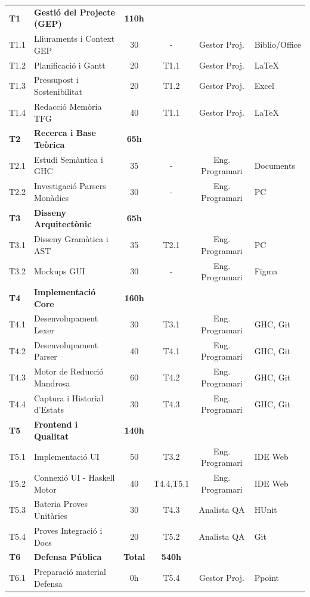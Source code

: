 \begin{longtable}{@{}lp{5cm}cccp{3cm}@{}}
\textbf{T1} & \textbf{Gestió del Projecte (GEP)} & \textbf{110h} & & & \\
T1.1 & Lliuraments i Context GEP & 30 & - & Gestor Proj. & Biblio/Office \\
T1.2 & Planificació i Gantt & 20 & T1.1 & Gestor Proj. & LaTeX \\
T1.3 & Pressupost i Sostenibilitat & 20 & T1.2 & Gestor Proj. & Excel \\
T1.4 & Redacció Memòria TFG & 40 & T1.1 & Gestor Proj. & LaTeX \\
\midrule
\textbf{T2} & \textbf{Recerca i Base Teòrica} & \textbf{65h} & & & \\
T2.1 & Estudi Semàntica i GHC & 35 & - & Eng. Programari & Documents \\
T2.2 & Investigació Parsers Monàdics & 30 & - & Eng. Programari & PC \\
\midrule
\textbf{T3} & \textbf{Disseny Arquitectònic} & \textbf{65h} & & & \\
T3.1 & Disseny Gramàtica i AST & 35 & T2.1 & Eng. Programari & PC \\
T3.2 & Mockups GUI & 30 & - & Eng. Programari & Figma \\
\midrule
\textbf{T4} & \textbf{Implementació Core} & \textbf{160h} & & & \\
T4.1 & Desenvolupament Lexer & 30 & T3.1 & Eng. Programari & GHC, Git \\
T4.2 & Desenvolupament Parser & 40 & T4.1 & Eng. Programari & GHC, Git \\
T4.3 & Motor de Reducció Mandrosa & 60 & T4.2 & Eng. Programari & GHC, Git \\
T4.4 & Captura i Historial d'Estats & 30 & T4.3 & Eng. Programari & GHC, Git \\
\midrule
\textbf{T5} & \textbf{Frontend i Qualitat} & \textbf{140h} & & & \\
T5.1 & Implementació UI & 50 & T3.2 & Eng. Programari & IDE Web \\
T5.2 & Connexió UI - Haskell Motor & 40 & T4.4,T5.1 & Eng. Programari & IDE Web \\
T5.3 & Bateria Proves Unitàries & 30 & T4.3 & Analista QA & HUnit \\
T5.4 & Proves Integració i Docs & 20 & T5.2 & Analista QA & Git \\
\midrule
\textbf{T6} & \textbf{Defensa Pública} & \textbf{Total} & \textbf{540h} & & \\
T6.1 & Preparació material Defensa & 0h & T5.4 & Gestor Proj. & Ppoint \\
\end{longtable}

